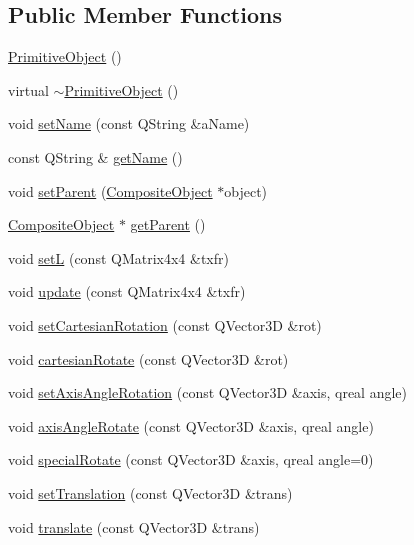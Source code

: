 \subsection*{Public Member Functions}
\begin{DoxyCompactItemize}
\item 
\hyperlink{class_robot_model_1_1_primitive_object_ad8db4622c9ec75d92c70f4fba00863bf}{PrimitiveObject} ()
\item 
virtual \hyperlink{class_robot_model_1_1_primitive_object_a30e56bb8d777bf91ec7627fdfa0073b2}{$\sim$PrimitiveObject} ()
\item 
void \hyperlink{class_robot_model_1_1_primitive_object_a61c7cffdac933e1f363fa7d4715f669c}{setName} (const QString \&aName)
\item 
const QString \& \hyperlink{class_robot_model_1_1_primitive_object_a2bad14bd18e70f3e95b6ebfca7014d2e}{getName} ()
\item 
void \hyperlink{class_robot_model_1_1_primitive_object_afdcf8007d5aebfa88356d5551afb9775}{setParent} (\hyperlink{class_robot_model_1_1_composite_object}{CompositeObject} $\ast$object)
\item 
\hyperlink{class_robot_model_1_1_composite_object}{CompositeObject} $\ast$ \hyperlink{class_robot_model_1_1_primitive_object_a6981588496b77d1942435296631d1ef0}{getParent} ()
\item 
void \hyperlink{class_robot_model_1_1_primitive_object_a2d5bb08b04bf39964106c981cdca7d0e}{setL} (const QMatrix4x4 \&txfr)
\item 
void \hyperlink{class_robot_model_1_1_primitive_object_ac87b33448b7e82dddbca79f57ea8cbb5}{update} (const QMatrix4x4 \&txfr)
\item 
void \hyperlink{class_robot_model_1_1_primitive_object_a0a7cfefb126e4f37c208c516f8ffd9bb}{setCartesianRotation} (const QVector3D \&rot)
\item 
void \hyperlink{class_robot_model_1_1_primitive_object_a69c30287deb6549fbde68d1ba37424a8}{cartesianRotate} (const QVector3D \&rot)
\item 
void \hyperlink{class_robot_model_1_1_primitive_object_a3ae3782ae64f5fc07f4d18646e04ed21}{setAxisAngleRotation} (const QVector3D \&axis, qreal angle)
\item 
void \hyperlink{class_robot_model_1_1_primitive_object_a97b449302680b96410ff7296c794f640}{axisAngleRotate} (const QVector3D \&axis, qreal angle)
\item 
void \hyperlink{class_robot_model_1_1_primitive_object_a07ece283ed8f0f0e3cdf6f36ac7b34dd}{specialRotate} (const QVector3D \&axis, qreal angle=0)
\item 
void \hyperlink{class_robot_model_1_1_primitive_object_ae6c417003b52df18a52711031e95c44a}{setTranslation} (const QVector3D \&trans)
\item 
void \hyperlink{class_robot_model_1_1_primitive_object_ae41a1dcacd77b59c44409a77b0183a77}{translate} (const QVector3D \&trans)
\end{DoxyCompactItemize}
